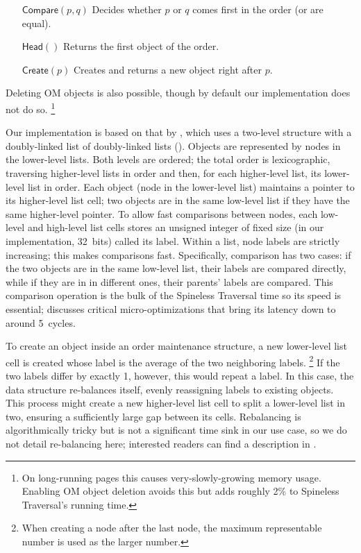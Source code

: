 \begin{enumerate}
\setlength{\itemindent}{8em}
  
\item[$\mathsf{Compare}(p, q)$] Decides whether $p$ or $q$ comes first in the order (or are equal).
\item[$\mathsf{Head}()$] Returns the first object of the order.
\item[$\mathsf{Create}(p)$] Creates and returns a new object right after $p$.
\end{enumerate}

\noindent
Deleting OM objects is also possible, though by default
  our implementation does not do so.%
\footnote{On long-running pages
  this causes very-slowly-growing memory usage.
  Enabling OM object deletion avoids this but adds
  roughly 2\% to Spineless Traversal's running time.}

Our implementation is based on that by \citet{SOM},
  which uses a two-level structure with
  a doubly-linked list of doubly-linked lists
  ().
Objects are represented by nodes in the lower-level lists.
Both levels are ordered;
  the total order is lexicographic,
  traversing higher-level lists in order
  and then, for each higher-level list,
  its lower-level list in order.
Each object (node in the lower-level list)
  maintains a pointer to its higher-level list cell;
  two objects are in the same low-level list
  if they have the same higher-level pointer.
To allow fast comparisons between nodes,
  each low-level and high-level list cells stores
  an unsigned integer of fixed size
  (in our implementation, 32~bits)
  called its label.
Within a list, node labels are strictly increasing;
  this makes comparisons fast.
Specifically, comparison has two cases:
  if the two objects are in the same low-level list,
  their labels are compared directly,
  while if they are in in different ones,
  their parents' labels are compared.
This comparison operation is
  the bulk of the Spineless Traversal time
  so its speed is essential;
   discusses critical micro-optimizations
  that bring its latency down to around 5~cycles.

To create an object inside an order maintenance structure,
  a new lower-level list cell is created
  whose label is the average of the two neighboring labels.%
\footnote{
  When creating a node after the last node,
  the maximum representable number is used as the larger number.
}
If the two labels differ by exactly 1, however,
  this would repeat a label.
In this case, the data structure re-balances itself,
  evenly reassigning labels to existing objects.
This process might
  create a new higher-level list cell
  to split a lower-level list in two,
  ensuring a sufficiently large gap between its cells.
Rebalancing is algorithmically tricky
  but is not a significant time sink in our use case,
  so we do not detail re-balancing here;
  interested readers can find a description in \citet{SOM}.

